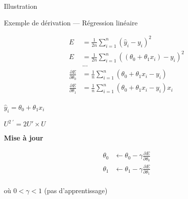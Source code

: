 \begin{frame}{Illustration}
\end{frame}


\begin{frame}{Exemple de dérivation --- Régression linéaire}
  \begin{minipage}[l]{0.49\linewidth}
    \begin{align*}
      E & = \frac{1}{2n} \sum_{i=1}^n( \hat{y}_i - y_i )^2 \\
      E & = \frac{1}{2n}\sum_{i=1}^n( (\theta_0 + \theta_1 x_i) - y_i )^2 \\
      & ... \\
      \frac{\partial E}{\partial \theta_0} & = \frac{1}{n}\sum^n_{i=1}(\theta_0 + \theta_1 x_i - y_i) \\
      \frac{\partial E}{\partial \theta_1} & = \frac{1}{n}\sum^n_{i=1}(\theta_0 + \theta_1 x_i - y_i) x_i \\
    \end{align*}
  \end{minipage}\hfill
  \begin{minipage}[c]{0.49\linewidth}
    \begin{center}
      $\boxed{\hat{y}_i = \theta_0 + \theta_1 x_i}$
    \end{center}

    \begin{center}
      $\boxed{U^{2\;\prime}=2U' \times U}$
    \end{center}

    \begin{center}
      \textbf{Mise à jour}

      \begin{align*}
        \theta_0 & \leftarrow \theta_0 - \gamma\frac{\partial{E}}{\partial{\theta_0}} \\
        \theta_1 & \leftarrow \theta_1 - \gamma\frac{\partial{E}}{\partial{\theta_1}} \\
      \end{align*}

      où $0 < \gamma < 1$ (pas d'apprentissage)
    \end{center}
  \end{minipage}\hfill
\end{frame}
